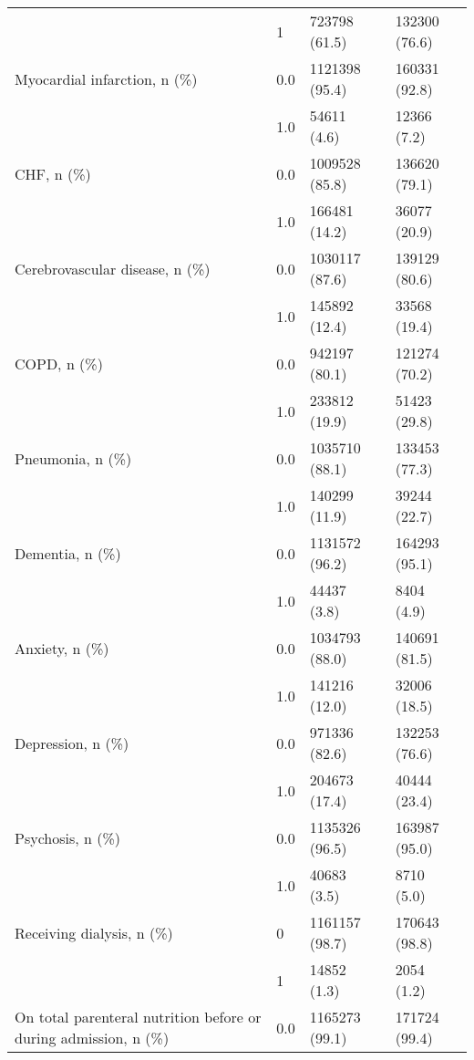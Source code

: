 \begin{tabular}{llll}
                                       & 1 &      723798 (61.5) &      132300 (76.6) \\
Myocardial infarction, n (\%) & 0.0 &     1121398 (95.4) &      160331 (92.8) \\
                                       & 1.0 &        54611 (4.6) &        12366 (7.2) \\
CHF, n (\%) & 0.0 &     1009528 (85.8) &      136620 (79.1) \\
                                       & 1.0 &      166481 (14.2) &       36077 (20.9) \\
Cerebrovascular disease, n (\%) & 0.0 &     1030117 (87.6) &      139129 (80.6) \\
                                       & 1.0 &      145892 (12.4) &       33568 (19.4) \\
COPD, n (\%) & 0.0 &      942197 (80.1) &      121274 (70.2) \\
                                       & 1.0 &      233812 (19.9) &       51423 (29.8) \\
Pneumonia, n (\%) & 0.0 &     1035710 (88.1) &      133453 (77.3) \\
                                       & 1.0 &      140299 (11.9) &       39244 (22.7) \\
Dementia, n (\%) & 0.0 &     1131572 (96.2) &      164293 (95.1) \\
                                       & 1.0 &        44437 (3.8) &         8404 (4.9) \\
Anxiety, n (\%) & 0.0 &     1034793 (88.0) &      140691 (81.5) \\
                                       & 1.0 &      141216 (12.0) &       32006 (18.5) \\
Depression, n (\%) & 0.0 &      971336 (82.6) &      132253 (76.6) \\
                                       & 1.0 &      204673 (17.4) &       40444 (23.4) \\
Psychosis, n (\%) & 0.0 &     1135326 (96.5) &      163987 (95.0) \\
                                       & 1.0 &        40683 (3.5) &         8710 (5.0) \\
Receiving dialysis, n (\%) & 0 &     1161157 (98.7) &      170643 (98.8) \\
                                       & 1 &        14852 (1.3) &         2054 (1.2) \\
On total parenteral nutrition before or during admission, n (\%) & 0.0 &     1165273 (99.1) &      171724 (99.4) \\

\end{tabular}
